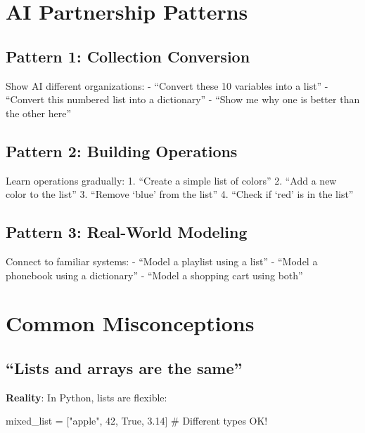 \documentclass[
  letterpaper,
  DIV=11,
  numbers=noendperiod,
  oneside]{scrreprt}
\newenvironment{Shaded}{}{}
\newcommand{\CommentTok}[1]{\textcolor[rgb]{0.42,0.45,0.49}{#1}}
\newcommand{\DecValTok}[1]{\textcolor[rgb]{0.00,0.36,0.77}{#1}}
\newcommand{\FloatTok}[1]{\textcolor[rgb]{0.00,0.36,0.77}{#1}}
\newcommand{\NormalTok}[1]{\textcolor[rgb]{0.14,0.16,0.18}{#1}}
\newcommand{\OperatorTok}[1]{\textcolor[rgb]{0.14,0.16,0.18}{#1}}
\newcommand{\StringTok}[1]{\textcolor[rgb]{0.01,0.18,0.38}{#1}}
\newcommand{\VariableTok}[1]{\textcolor[rgb]{0.89,0.38,0.04}{#1}}
\begin{document}
\section{AI Partnership Patterns}\label{ai-partnership-patterns-6}

\subsection{Pattern 1: Collection
Conversion}\label{pattern-1-collection-conversion}

Show AI different organizations: - ``Convert these 10 variables into a
list'' - ``Convert this numbered list into a dictionary'' - ``Show me
why one is better than the other here''

\subsection{Pattern 2: Building
Operations}\label{pattern-2-building-operations}

Learn operations gradually: 1. ``Create a simple list of colors'' 2.
``Add a new color to the list'' 3. ``Remove `blue' from the list'' 4.
``Check if `red' is in the list''

\subsection{Pattern 3: Real-World
Modeling}\label{pattern-3-real-world-modeling}

Connect to familiar systems: - ``Model a playlist using a list'' -
``Model a phonebook using a dictionary'' - ``Model a shopping cart using
both''

\section{Common Misconceptions}\label{common-misconceptions-6}

\subsection{``Lists and arrays are the
same''}\label{lists-and-arrays-are-the-same}

\textbf{Reality}: In Python, lists are flexible:

\begin{Shaded}
\begin{Highlighting}[]
\NormalTok{mixed\_list }\OperatorTok{=}\NormalTok{ [}\StringTok{"apple"}\NormalTok{, }\DecValTok{42}\NormalTok{, }\VariableTok{True}\NormalTok{, }\FloatTok{3.14}\NormalTok{]  }\CommentTok{\# Different types OK!}
\end{Highlighting}
\end{Shaded}
\end{document}
